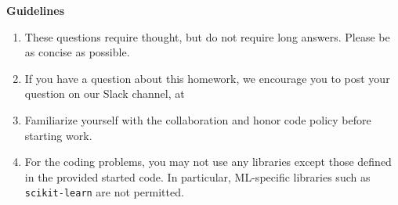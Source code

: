 {\bf Guidelines}
\begin{enumerate}
    \item These questions require thought, but do not require long answers. Please be as concise as possible.
    \item If you have a question about this homework, we encourage you to post your question on our Slack channel, at \slack
    \item Familiarize yourself with the collaboration and honor code policy before starting work.
    \item For the coding problems, you may not use any libraries except those defined in the provided started code. In particular, ML-specific libraries such as \texttt{scikit-learn} are not permitted.
\end{enumerate}
